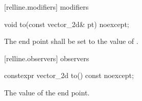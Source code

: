  [relline.modifiers]{ modifiers}

\begin{itemdecl}
void to(const vector_2d& pt) noexcept;
\end{itemdecl}
\begin{itemdescr}
\pnum
\effects
The end point shall be set to the value of .
\end{itemdescr}

 [relline.observers]{ observers}

\begin{itemdecl}
constexpr vector_2d to() const noexcept;
\end{itemdecl}
\begin{itemdescr}
\pnum
\returns
The value of the end point.
\end{itemdescr}
